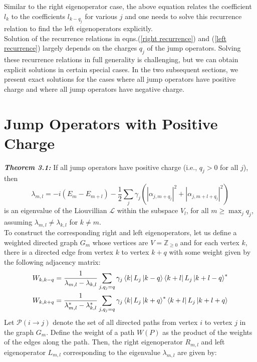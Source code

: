 \documentclass[11pt,a4paper]{article}
\begin{document}
Similar to the right eigenoperator case, the above equation relates the coefficient $l_k$ to the coefficients $l_{k - q_j}$ for various $j$ and one needs to solve this recurrence relation to find the left eigenoperators explicitly.\\
Solution of the recurrence relations in eqns.(\ref{right recurrence}) and (\ref{left recurrence}) largely depends on the charges $q_j$ of the jump operators. 
Solving these recurrence relations in full generality is challenging, but we can obtain explicit solutions in certain special cases. In the two subsequent sections, we present exact solutions for the cases where all jump operators have positive charge and where all jump operators have negative charge.



\section{Jump Operators with Positive Charge}
\textit{\textbf{Theorem 3.1: }} If all jump operators have positive charge (i.e., $q_j > 0$ for all $j$), then 
\begin{equation}
    \lambda_{m,l} = -i (E_m - E_{m+l}) - \frac{1}{2} \sum_{j} \gamma_j \left( |\alpha_{j,m+q_j}|^2 + |\alpha_{j,m+l+q_j}|^2 \right) \label{eigenvalue positive charge}
\end{equation}
is an eigenvalue of the Liouvillian $\mathcal{L}$ within the subspace $V_l$, for all $m \geq \max_{j} q_j $, assuming $\lambda_{m,l} \neq \lambda_{k,l}$ for $k \neq m$. \\
To construct the corresponding right and left eigenoperators, let us define a weighted directed graph $G_m$ whose vertices are $V = \mathbb{Z}_{\geq 0}$
and for each vertex $k$, there is a directed edge from vertex $k$ to vertex $k + q$ with some weight given by the following adjacency matrix:
\begin{gather}
    W_{k,k-q} = \frac{1}{\lambda_{m,l} - \lambda_{k,l}} \sum_{j, q_j=q} \gamma_j \bra{k}L_j\ket{k-q} \bra{k+l}L_j\ket{k+l-q}^*  \\
    W_{k,k+q} = \frac{1}{\lambda_{m,l}^* - \lambda_{k,l}^*} \sum_{j, q_j=q} \gamma_j \bra{k}L_j\ket{k+q}^* \bra{k+l}L_j\ket{k+l+q}
\end{gather}
Let $\mathcal{P}(i \to j)$ denote the set of all directed paths from vertex $i$ to vertex $j$ in the graph $G_m$. 
Define the weight of a path $W(P)$ as the product of the weights of the edges along the path. Then, the right eigenoperator $R_{m,l}$ and left eigenoperator $L_{m,l}$ corresponding to the eigenvalue $\lambda_{m,l}$ are given by:
\end{document}
